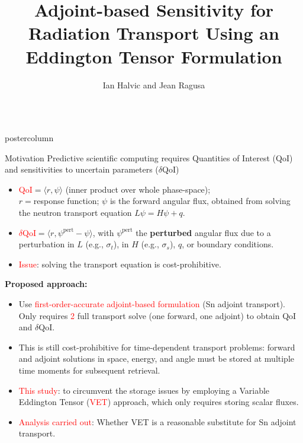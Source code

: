 \documentclass[xcolor={usenames,dvipsnames,svgnames,table}]{beamer}
\title[<short>]{Adjoint-based Sensitivity for Radiation Transport Using an Eddington Tensor Formulation}
\author[<short>]{Ian Halvic and Jean Ragusa}
\institute{Department of Nuclear Engineering, Texas A\&M University, College Station, TX, USA 77843}
\newcommand{\tcr}[1]{\textcolor{red}{#1}}
\newlength{\columnheight}
\begin{document}
\begin{frame}
	\begin{columns}

	\begin{column}{.33\textwidth}
		\begin{beamercolorbox}[center,wd=\textwidth]{postercolumn}
			\begin{minipage}[T]{0.95\textwidth} %
			\parbox[t][\columnheight]{\textwidth}{ %

			    \begin{block}{Motivation}
					Predictive scientific computing requires Quantities of Interest (QoI) and sensitivities to uncertain parameters ($\delta$QoI) 
					\begin{itemize}
					\item \tcr{QoI}$=\langle r, \psi \rangle$ (inner product over whole phase-space);\\ $r=$response function; $\psi$ is the forward angular flux, obtained from solving the neutron transport equation $L \psi = H\psi +q$.
					\item \tcr{$\delta$QoI}$=\langle r, \psi^{\text{pert}}-\psi \rangle$, with $\psi^{\text{pert}}$ the {\bf perturbed} angular flux due to a perturbation in $L$ (e.g., $\sigma_t$), in $H$ (e.g., $\sigma_s$), $q$, or boundary conditions.
					\item \tcr{Issue}: solving the transport equation is cost-prohibitive.
					\end{itemize}
					\vspace{1cm}
{\bf Proposed approach:}
\begin{itemize}
  \item Use \tcr{first-order-accurate adjoint-based formulation} (Sn adjoint transport).\\
	Only requires \tcr{2} full transport solve (one forward, one adjoint) to obtain QoI and $\delta$QoI.
	\item This is still cost-prohibitive for time-dependent transport problems: forward and adjoint solutions in space, energy, and angle must be stored at multiple time moments for subsequent retrieval.
	\item \tcr{This study}: to circumvent the storage issues by employing a Variable Eddington Tensor (\tcr{VET}) approach, which only requires storing scalar fluxes.
	\item \tcr{Analysis carried out}: Whether VET is a reasonable substitute for Sn adjoint transport.
\end{itemize}


\end{block}}
\end{minipage}
\end{beamercolorbox}
\end{column}
\end{columns}
\end{frame}
\end{document}
